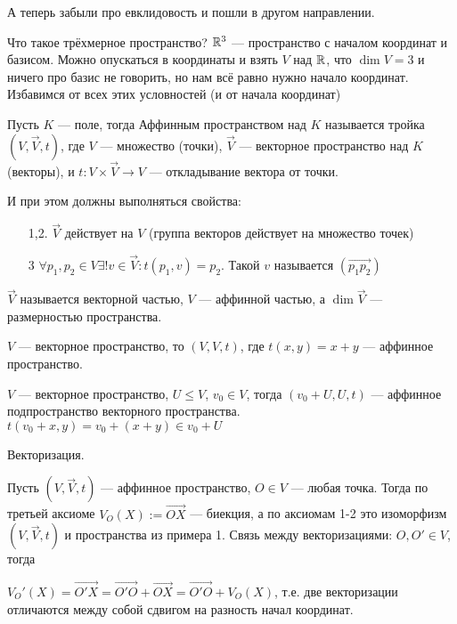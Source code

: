 А теперь забыли про евклидовость и пошли в другом направлении.


Что такое трёхмерное пространство? $\mathbb{R}^3$ --- пространство с началом координат и базисом. Можно опускаться в координаты и взять $V$ над $\mathbb{R}$, что $\dim V = 3$ и ничего про базис не говорить, но нам всё равно нужно начало координат. Избавимся от всех этих условностей (и от начала координат)

\begin{definition}
	Пусть $K$ --- поле, тогда Аффинным пространством над $K$ называется тройка $(V, \vec{V}, t)$, где $V$ --- множество (точки), $\vec{V}$ --- векторное пространство над $K$ (векторы), и $t: V \times \vec{V} \to V$ --- откладывание вектора от точки.

	И при этом должны выполняться свойства:

	\begin{enumerate}
		\item[1,2.] $\vec{V}$ действует на $V$ (группа векторов действует на множество точек)
		\item[3] $\forall p_1, p_2 \in V \exists ! v \in \vec{V} : t(p_1, v) = p_2$. Такой $v$ называется $(\overrightarrow{p_1 p_2})$
	\end{enumerate}

	$\vec{V}$ называется векторной частью, $V$ --- аффинной частью, а $\dim \vec{V}$ --- размерностью пространства.
\end{definition}

\begin{example}
    $V$ --- векторное пространство, то $(V, V, t)$, где $t(x, y) = x + y$ --- аффинное пространство.
\end{example}
\begin{example}
    $V$ --- векторное пространство, $U \le V$, $v_0 \in V$, тогда $(v_0 + U, U, t)$ --- аффинное подпространство векторного пространства. $t(v_0 + x, y) = v_0 + (x + y) \in v_0 + U$
\end{example}
\begin{definition}
    Векторизация.

    Пусть $(V, \vec{V}, t)$ --- аффинное пространство, $O \in V$ --- любая точка. Тогда по третьей аксиоме $V_O(X) := \overrightarrow{OX}$ --- биекция, а по аксиомам 1-2 это изоморфизм $(V, \vec{V}, t)$ и пространства из примера 1. Связь между векторизациями: $O, O' \in V$, тогда

    $V_O'(X) = \overrightarrow{O'X} = \overrightarrow{O'O} + \overrightarrow{OX} = \overrightarrow{O'O} + V_O(X)$, т.е. две векторизации отличаются между собой сдвигом на разность начал координат.
\end{definition}

